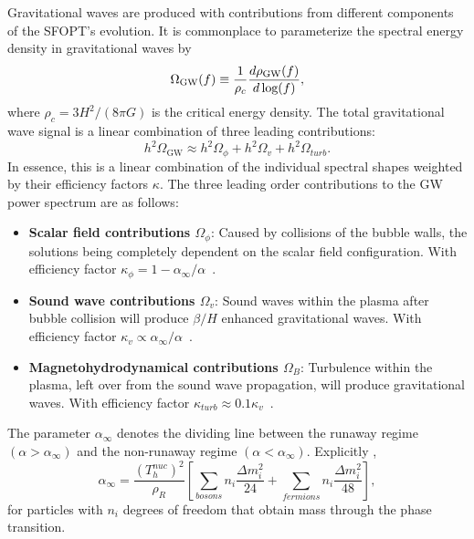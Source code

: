 \documentclass[nofootinbib,twocolumn,preprintnumbers]{revtex4-1}
\begin{document}
Gravitational waves are produced with contributions from different components of the SFOPT's evolution.  It is commonplace to parameterize the spectral energy density in gravitational waves by~\citep{PhysRevD.75.043507} 
\begin{equation}
\Omega_{\textrm{GW}} (f) \equiv \frac{1}{ \rho_{c}} \frac{d \rho_{\textrm{GW}}(f) }{d \textrm{\,log}(f)} , 
\end{equation}
where $\rho_{c} = 3H^2/(8 \pi G)$ is the critical energy density. The total gravitational wave signal is a linear combination of three leading contributions:
\begin{equation}
h^2\Omega_{\textrm{GW}} \approx h^2\Omega_{\phi} + h^2\Omega_{v} + h^2\Omega_{turb} .
\end{equation}
In essence, this is a linear combination of the individual spectral shapes weighted by their efficiency factors $\kappa$. 
The three leading order contributions to the GW power spectrum are as follows:
\begin{itemize}
\item \textbf{Scalar field contributions $\Omega_{\phi}$}: Caused by collisions of the bubble walls, the solutions being completely dependent on the scalar field configuration. With efficiency factor $\kappa_{\phi} = 1 - \alpha_{\infty}/\alpha$~\citep{PhysRevD.45.4514, Huber_2008}. 
\item \textbf{Sound wave contributions $\Omega_{v}$}: Sound waves within the plasma after bubble collision will produce $\beta/H$ enhanced gravitational waves. With efficiency factor $\kappa_{v} \propto \alpha_{\infty}/\alpha$~\citep{PhysRevLett.112.041301}.
\item \textbf{Magnetohydrodynamical contributions $\Omega_{B}$}: Turbulence within the plasma, left over from the sound wave propagation, will produce gravitational waves. With efficiency factor $\kappa_{
turb} \approx 0.1 \kappa_{v} $~\citep{PhysRevD.74.063521}.
\end{itemize}
The parameter $\alpha_{\infty}$ denotes the dividing line between the runaway regime  $(\alpha >\alpha_{\infty})$ and the non-runaway regime $(\alpha <\alpha_{\infty})$. Explicitly \cite{Breitbach:2018ddu, Caprini:2015zlo, Espinosa:2010hh}, 
\begin{equation}\label{eqn:critPTstrength}
\alpha_{\infty} = \frac{(T^{nuc}_h)^2}{\rho_R}\left[\sum_{bosons} n_i\frac{\Delta m^2_i}{24} + \sum_{fermions} n_i\frac{\Delta m_i^2}{48}\right],
\end{equation} 
for particles with $n_i$ degrees of freedom that obtain mass through the phase transition. 
\end{document}
